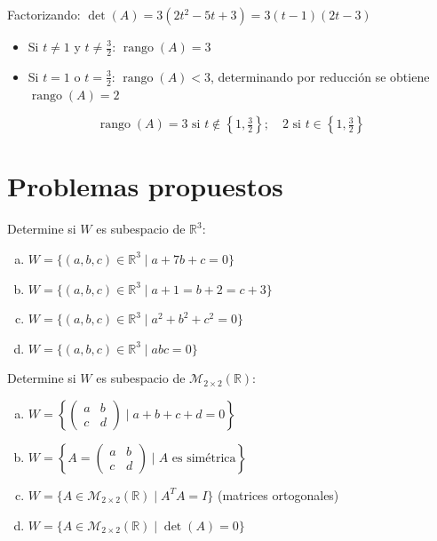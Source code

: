 \begin{prob}
\begin{myproof}
Factorizando: $\det(A) = 3(2t^2-5t+3) = 3(t-1)(2t-3)$

\begin{itemize}
    \item Si $t \neq 1$ y $t \neq \frac{3}{2}$: $\operatorname{rango}(A) = 3$
    \item Si $t = 1$ o $t = \frac{3}{2}$: $\operatorname{rango}(A) < 3$, determinando por reducción se obtiene $\operatorname{rango}(A) = 2$
\end{itemize}
$$\boxed{\operatorname{rango}(A) = 3 \text{ si } t \notin \left\{1,\tfrac{3}{2}\right\};\quad 2 \text{ si } t \in \left\{1,\tfrac{3}{2}\right\}}$$
\end{myproof}
\end{prob}

\section{Problemas propuestos}

\begin{prob} Determine si $W$ es subespacio de $\mathbb{R}^3$:
\begin{enumerate}[(a)]
\item $W = \{(a,b,c) \in \mathbb{R}^3 \mid a + 7b + c = 0\}$
\item $W = \{(a,b,c) \in \mathbb{R}^3 \mid a + 1 = b + 2 = c + 3\}$
\item $W = \{(a,b,c) \in \mathbb{R}^3 \mid a^2 + b^2 + c^2 = 0\}$
\item $W = \{(a,b,c) \in \mathbb{R}^3 \mid abc = 0\}$
\end{enumerate}
\end{prob}

\begin{prob} Determine si $W$ es subespacio de $\mathcal{M}_{2 \times 2}(\mathbb{R})$:
\begin{enumerate}[(a)]
\item $W = \left\{\begin{pmatrix} a & b \\ c & d \end{pmatrix} \mid a + b + c + d = 0\right\}$
\item $W = \left\{A = \begin{pmatrix} a & b \\ c & d \end{pmatrix} \mid A \text{ es simétrica}\right\}$
\item $W = \{A \in \mathcal{M}_{2 \times 2}(\mathbb{R}) \mid A^TA = I\}$ (matrices ortogonales)
\item $W = \{A \in \mathcal{M}_{2 \times 2}(\mathbb{R}) \mid \det(A) = 0\}$
\end{enumerate}
\end{prob}

